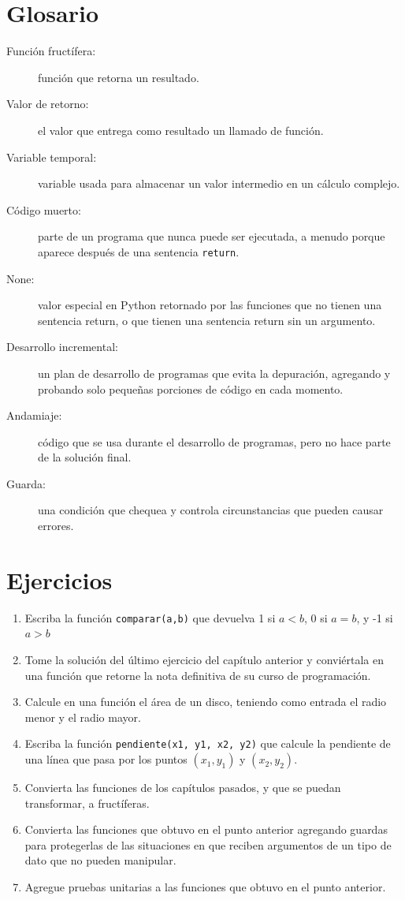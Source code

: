 \section{Glosario}
\begin{description}
\item [{Función fructífera:}] función que retorna un resultado.
\item [{Valor de retorno:}] el valor que entrega como resultado un llamado
de función.
\item [{Variable temporal:}] variable usada para almacenar un valor intermedio
en un cálculo complejo.
\item [{Código muerto:}] parte de un programa que nunca puede ser ejecutada,
a menudo porque aparece después de una sentencia \texttt{return}.
\item [{None:}] valor especial en Python retornado por las funciones que
no tienen una sentencia return, o que tienen una sentencia return
sin un argumento.
\item [{Desarrollo incremental:}] un plan de desarrollo de programas que
evita la depuración, agregando y probando solo pequeñas porciones
de código en cada momento.
\item [{Andamiaje:}] código que se usa durante el desarrollo de programas,
pero no hace parte de la solución final.
\item [{Guarda:}] una condición que chequea y controla circunstancias que
pueden causar errores.

  
  
 
\end{description}

\section{Ejercicios}
\begin{enumerate}
\item Escriba la función \verb+comparar(a,b)+ que devuelva 1 si $a<b$,
0 si $a=b$, y -1 si $a>b$
\item Tome la solución del último ejercicio del capítulo anterior y conviértala
en una función que retorne la nota definitiva de su curso de programación.
\item Calcule en una función el área de un disco, teniendo como entrada
el radio menor y el radio mayor.
\item Escriba la función \verb+pendiente(x1, y1, x2, y2)+ que calcule la
pendiente de una línea que pasa por los puntos $(x_{1},y_{1})$ y
$(x_{2},y_{2})$.
\item Convierta las funciones de los capítulos pasados, y que se puedan
transformar, a fructíferas.
\item Convierta las funciones que obtuvo en el punto anterior agregando
guardas para protegerlas de las situaciones en que reciben argumentos
de un tipo de dato que no pueden manipular.
\item Agregue pruebas unitarias a las funciones que obtuvo en el punto anterior.
\end{enumerate}

